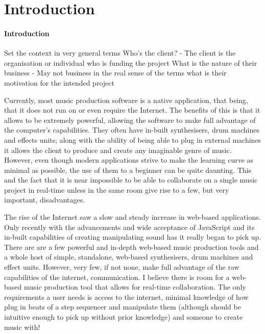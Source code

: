 \documentclass[a4paper]{article}
\begin{document}
\tableofcontents

\newpage

\justify

\section{Introduction}

\paragraph{Introduction}

Set the context in very general terms
Who's the client?
    - The client is the organisation or individual who is funding the project
What is the nature of their business
    - May not business in the real sense of the terms
what is their motivation for the intended project

Currently, most music production software is a native application, that being, that it does not run on or even require the Internet. The benefits of this is that it allows to be extremely powerful, allowing the software to make full advantage of the computer's capabilities. They often have in-built synthesisers, drum machines and effects units; along with the ability of being able to plug in external machines it allows the client to produce and create any imaginable genre of music. However, even though modern applications strive to make the learning curve as minimal as possible, the use of them to a beginner can be quite daunting. This and the fact that it is near impossible to be able to collaborate on a single music project in real-time unless in the same room give rise to a few, but very important, disadvantages. \par

The rise of the Internet saw a slow and steady increase in web-based applications. Only recently with the advancements and wide acceptance of JavaScript and its in-built capabilities of creating manipulating sound has it really began to pick up. There are are a few powerful and in-depth web-based music production tools and a whole host of simple, standalone, web-based synthesisers, drum machines and effect units. However, very few, if not none, make full advantage of the raw capabilities of the internet, communication. I believe there is room for a web-based music production tool that allows for real-time collaboration. The only requirements a user needs is access to the internet, minimal knowledge of how plug in beats of a step sequencer and manipulate them (although should be intuitive enough to pick up without prior knowledge) and someone to create music with!
\end{document}
